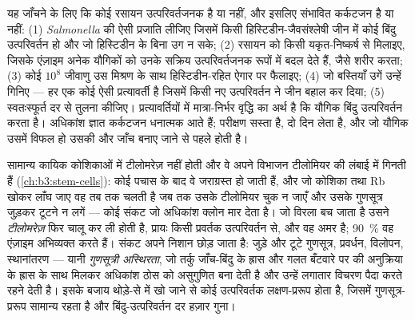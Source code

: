 \begin{method}[एम्स परीक्षण]\label{met:b3:cancer-biology:ames}
यह जाँचने के लिए कि कोई रसायन उत्परिवर्तजनक है या नहीं, और इसलिए
संभावित कर्कटजन है या नहीं: (1) \emph{Salmonella} की ऐसी प्रजाति लीजिए
जिसमें किसी हिस्टिडीन-जैवसंश्लेषी जीन में कोई बिंदु उत्परिवर्तन हो और
जो हिस्टिडीन के बिना उग न सके; (2) रसायन को किसी यकृत-निष्कर्ष से
मिलाइए, जिसके एंज़ाइम अनेक यौगिकों को उनके सक्रिय उत्परिवर्तजनक रूपों
में बदल देते हैं, जैसे शरीर करता; (3) कोई $10^{8}$ जीवाणु उस मिश्रण के
साथ हिस्टिडीन-रहित ऐगार पर फैलाइए;
(4) जो बस्तियाँ उगें उन्हें गिनिए --- हर एक कोई ऐसी प्रत्यावर्ती है
जिसमें किसी नए उत्परिवर्तन ने जीन बहाल कर दिया; (5) स्वतःस्फूर्त दर से
तुलना कीजिए। प्रत्यावर्तियों में मात्रा-निर्भर वृद्धि का अर्थ है कि
यौगिक बिंदु उत्परिवर्तन करता है। अधिकांश ज्ञात कर्कटजन धनात्मक आते
हैं; परीक्षण सस्ता है, दो दिन लेता है, और जो यौगिक उसमें विफल हो उसकी
और जाँच बनाए जाने से पहले होती है।
\end{method}

\begin{definition}[अमरता और अस्थिरता]\label{def:b3:cancer-biology:telomerase}
सामान्य कायिक कोशिकाओं में टीलोमरेज़ नहीं होती और वे अपने विभाजन
टीलोमियर की लंबाई में गिनती हैं (\cref{ch:b3:stem-cells}): कोई पचास के
बाद वे जराग्रस्त हो जाती हैं, और जो कोशिका  तथा Rb खोकर 
लाँघ जाए वह तब तक चलती है जब तक उसके टीलोमियर चुक न जाएँ और उसके
गुणसूत्र जुड़कर टूटने न लगें --- कोई संकट जो अधिकांश क्लोन मार देता है।
जो विरला बच जाता है उसने \emph{टीलोमरेज़} फिर चालू कर ली होती है,
प्रायः किसी प्रवर्तक उत्परिवर्तन से, और वह अमर है; \qty{90}{\%} 
वह एंज़ाइम अभिव्यक्त करते हैं। संकट अपने निशान छोड़ जाता है: जुड़े और
टूटे गुणसूत्र, प्रवर्धन, विलोपन, स्थानांतरण --- यानी
\emph{गुणसूत्री अस्थिरता}, जो तर्कु जाँच-बिंदु के ह्रास और गलत बँटवारे
पर  की अनुक्रिया के ह्रास के साथ मिलकर अधिकांश ठोस  को
असुगुणित बना देती है और उन्हें लगातार विचरण पैदा करते रहने देती है।
इसके बजाय थोड़े-से  में  खो जाने से कोई
उत्परिवर्तक लक्षण-प्ररूप होता है, जिसमें गुणसूत्र-प्ररूप सामान्य रहता
है और बिंदु-उत्परिवर्तन दर हज़ार गुना।
\end{definition}

